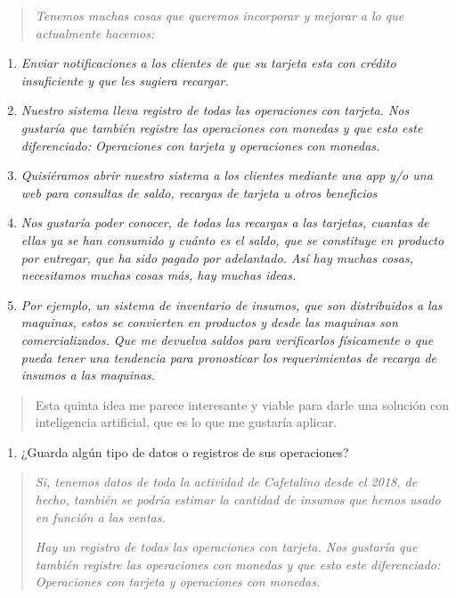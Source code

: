\begin{quote}
\emph{Tenemos muchas cosas que queremos incorporar y mejorar a lo que actualmente hacemos:}
\end{quote}

\begin{enumerate}
\def\labelenumi{\arabic{enumi}.}
\item
  \emph{Enviar notificaciones a los clientes de que su tarjeta esta con crédito insuficiente y que les sugiera recargar.}
\item
  \emph{Nuestro sistema lleva registro de todas las operaciones con tarjeta. Nos gustaría que también registre las operaciones con monedas y que esto este diferenciado: Operaciones con tarjeta y operaciones con monedas.}
\item
  \emph{Quisiéramos abrir nuestro sistema a los clientes mediante una app y/o una web para consultas de saldo, recargas de tarjeta u otros beneficios}
\item
  \emph{Nos gustaría poder conocer, de todas las recargas a las tarjetas, cuantas de ellas ya se han consumido y cuánto es el saldo, que se constituye en producto por entregar, que ha sido pagado por adelantado. Así hay muchas cosas, necesitamos muchas cosas más, hay muchas ideas.}
\item
  \emph{Por ejemplo, un sistema de inventario de insumos, que son distribuidos a las maquinas, estos se convierten en productos y desde las maquinas son comercializados. Que me devuelva saldos para verificarlos físicamente o que pueda tener una tendencia para pronosticar los requerimientos de recarga de insumos a las maquinas.}
\end{enumerate}

\begin{quote}
Esta quinta idea me parece interesante y viable para darle una solución con inteligencia artificial, que es lo que me gustaría aplicar.
\end{quote}

\begin{enumerate}
\def\labelenumi{\arabic{enumi}.}
\setcounter{enumi}{1}
\item
  ¿Guarda algún tipo de datos o registros de sus operaciones?
\end{enumerate}

\begin{quote}
\emph{Si, tenemos datos de toda la actividad de Cafetalino desde el 2018, de hecho, también se podría estimar la cantidad de insumos que hemos usado en función a las ventas.}

\emph{Hay un registro de todas las operaciones con tarjeta. Nos gustaría que también registre las operaciones con monedas y que esto este diferenciado: Operaciones con tarjeta y operaciones con monedas.}
\end{quote}

